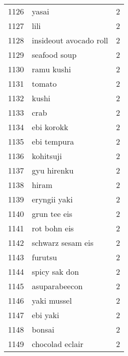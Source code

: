 \begin{tabular}{llr}
1126 &                                              yasai &      2 \\
1127 &                                               lili &      2 \\
1128 &                             insideout avocado roll &      2 \\
1129 &                                       seafood soup &      2 \\
1130 &                                         ramu kushi &      2 \\
1131 &                                             tomato &      2 \\
1132 &                                              kushi &      2 \\
1133 &                                               crab &      2 \\
1134 &                                         ebi korokk &      2 \\
1135 &                                        ebi tempura &      2 \\
1136 &                                          kohitsuji &      2 \\
1137 &                                        gyu hirenku &      2 \\
1138 &                                              hiram &      2 \\
1139 &                                       eryngii yaki &      2 \\
1140 &                                       grun tee eis &      2 \\
1141 &                                       rot bohn eis &      2 \\
1142 &                                  schwarz sesam eis &      2 \\
1143 &                                            furutsu &      2 \\
1144 &                                      spicy sak don &      2 \\
1145 &                                      asuparabeecon &      2 \\
1146 &                                        yaki mussel &      2 \\
1147 &                                           ebi yaki &      2 \\
1148 &                                             bonsai &      2 \\
1149 &                                    chocolad eclair &      2 \\

\end{tabular}
